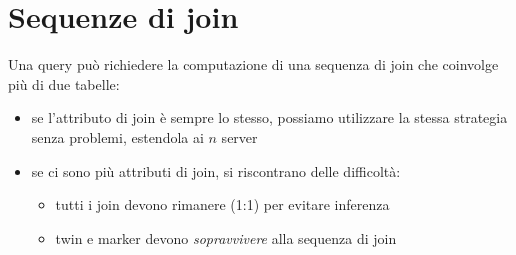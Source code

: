\documentclass{report}
\begin{document}
\section{Sequenze di join}
Una query può richiedere la computazione di una sequenza di join che coinvolge più di due 
tabelle:
\begin{itemize}
    \item se l'attributo di join è sempre lo stesso, possiamo utilizzare la stessa strategia senza 
    problemi, estendola ai $n$ server
    \item se ci sono più attributi di join, si riscontrano delle difficoltà:
    \begin{itemize}
        \item tutti i join devono rimanere (1:1) per evitare inferenza 
        \item twin e marker devono \textit{sopravvivere} alla sequenza di join 
    \end{itemize}
\end{itemize}
\end{document}
